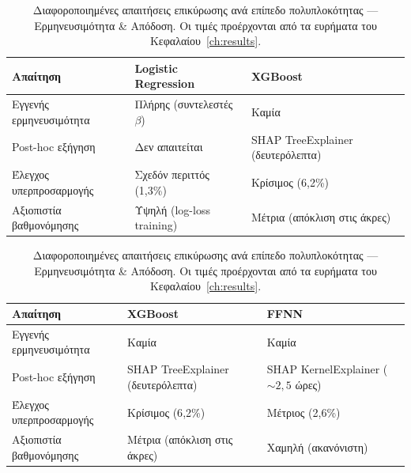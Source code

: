\begin{table}[htbp]
    \centering
    \renewcommand{\arraystretch}{1.3}
    \caption[Απαιτήσεις επικύρωσης ανά πολυπλοκότητα — Ερμηνευσιμότητα \& Απόδοση]{Διαφοροποιημένες απαιτήσεις επικύρωσης ανά επίπεδο
             πολυπλοκότητας --- Ερμηνευσιμότητα \& Απόδοση.
             Οι τιμές προέρχονται από τα ευρήματα του
             Κεφαλαίου~\ref{ch:results}.}
    \label{tab:complexity_a}
    \small
    \begin{tabular}{p{3.8cm}p{3.8cm}p{3.8cm}}
        \toprule
        \textbf{Απαίτηση} &
        \textbf{Logistic Regression} &
        \textbf{XGBoost} \\
        \midrule
        Εγγενής ερμηνευσιμότητα &
        Πλήρης (συντελεστές $\beta$) &
        Καμία \\
        \midrule
        Post-hoc εξήγηση &
        Δεν απαιτείται &
        SHAP TreeExplainer (δευτερόλεπτα) \\
        \midrule
        Έλεγχος υπερπροσαρμογής &
        Σχεδόν περιττός (1{,}3\%) &
        Κρίσιμος (6{,}2\%) \\
        \midrule
        Αξιοπιστία βαθμονόμησης &
        Υψηλή (log-loss training) &
        Μέτρια (απόκλιση στις άκρες) \\
        \bottomrule
    \end{tabular}

    \vspace{0.4cm}

    \begin{tabular}{p{3.8cm}p{3.8cm}p{3.8cm}}
        \toprule
        \textbf{Απαίτηση} &
        \textbf{XGBoost} &
        \textbf{FFNN} \\
        \midrule
        Εγγενής ερμηνευσιμότητα &
        Καμία &
        Καμία \\
        \midrule
        Post-hoc εξήγηση &
        SHAP TreeExplainer (δευτερόλεπτα) &
        SHAP KernelExplainer (${\sim}2{,}5$ ώρες) \\
        \midrule
        Έλεγχος υπερπροσαρμογής &
        Κρίσιμος (6{,}2\%) &
        Μέτριος (2{,}6\%) \\
        \midrule
        Αξιοπιστία βαθμονόμησης &
        Μέτρια (απόκλιση στις άκρες) &
        Χαμηλή (ακανόνιστη) \\
        \bottomrule
    \end{tabular}
\end{table}

